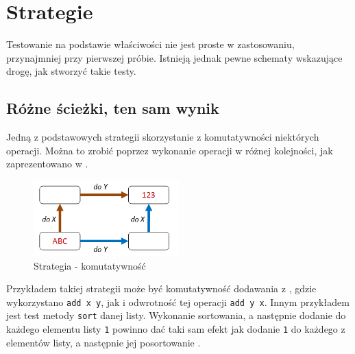 \section{Strategie}

Testowanie na podstawie właściwości nie jest proste w zastosowaniu, przynajmniej przy pierwszej próbie.
Istnieją jednak pewne schematy wskazujące drogę, jak stworzyć takie testy.
\subsection{Różne ścieżki, ten sam wynik}

Jedną z podstawowych strategii skorzystanie z komutatywności niektórych operacji. Można to zrobić poprzez wykonanie operacji w różnej kolejności, jak zaprezentowano w .
\begin{figure}[h]
    \centering
    \includegraphics[width=0.5\textwidth]{images/property_commutative.png}
    \caption{Strategia - komutatywność}
    \label{fig:commutative_strategy}
\end{figure}

Przykładem takiej strategii może być komutatywność dodawania z , gdzie wykorzystano \texttt{add x y}, jak i odwrotność tej operacji \texttt{add y x}. 
Innym przykładem jest test metody \texttt{sort} danej listy. 
Wykonanie sortowania, a następnie dodanie do każdego elementu listy \texttt{1} powinno dać taki sam efekt jak dodanie \texttt{1} do każdego z elementów listy, a następnie jej posortowanie  .

